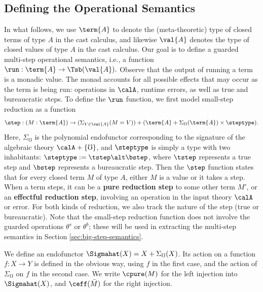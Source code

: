 \documentclass[acmsmall,screen,review,anonymous]{acmart}
\theoremstyle{remark}
\begin{document}


\subsection{Defining the Operational Semantics}

In what follows, we use $\term{A}$ to denote the (meta-theoretic) type of closed
terms of type $A$ in the cast calculus, and likewise $\val{A}$ denotes the type
of closed values of type $A$ in the cast calculus.
%
Our goal is to define a guarded multi-step operational semantics, i.e., a function
%
$\run : \term{A} \to \Tsb (\val{A}).$
%
Observe that the output of running a term is a monadic value. The monad accounts
for all possible effects that may occur as the term is being run: operations in
$\calA$, runtime errors, as well as true and bureaucratic steps.
%
To define the $\run$ function, we first model small-step reduction as a function
%
\[ \step : (M : \term{A}) \to (\Sigma_{V \in \val{A}} (M = V)) 
    + (\term{A} + \Sigma_\mho(\term{A}) \times \steptype). \]
%
Here, $\Sigma_\mho$ is the polynomial endofunctor corresponding to the signature
of the algebraic theory $\calA + \{ \mho \}$, and $\steptype$ is simply a type
with two inhabitants: $\steptype := \tstep \alt \bstep$, where $\tstep$
represents a true step and $\bstep$ represents a bureaucratic step.
%
Then the $\step$ function states that for every closed term $M$ of type $A$,
either $M$ is a value or it takes a step. When a term steps, it can be a
\textbf{pure reduction step} to some other term $M'$, or an \textbf{effectful
reduction step}, involving an operation in the input theory $\calA$ or error.
For both kinds of reduction, we also track the nature of the step (true or
bureaucratic).
%
Note that the small-step reduction function does not involve the guarded
operations $\theta^s$ or $\theta^b$; these will be used in extracting the
multi-step semantics in Section \ref{sec:big-step-semantics}.

We define an endofunctor $\Sigmahat(X) = X + \Sigma_\mho(X)$. Its action on a
function $f : X \to Y$ is defined in the obvious way, using $f$ in the first
case, and the action of $\Sigma_\mho$ on $f$ in the second case.
%
We write $\cpure(M)$ for the left injection into $\Sigmahat(X)$, and
$\ceff(\bar{M})$ for the right injection.
\end{document}
